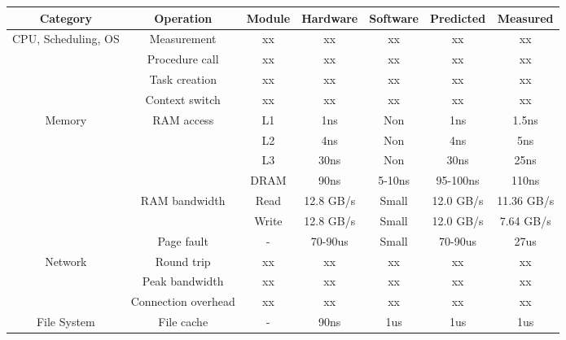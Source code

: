 
\begin{table*}[t]
	\centering
	\begin{tabular}{c|c|c|c|c|c|c}
		\hline
		\textbf{Category} & \textbf{Operation} & \textbf{Module} & \textbf{Hardware} & \textbf{Software}  & \textbf{Predicted} & \textbf{Measured} \\ \hline \hline

		\multirow{4}{*}{CPU, Scheduling, OS} & Measurement & xx & xx & xx & xx & xx \\ \cline{2-7}

          & Procedure call & xx & xx & xx & xx & xx \\ \cline{2-7}
          
          & Task creation & xx & xx & xx & xx & xx \\ \cline{2-7}
        
          & Context switch & xx & xx & xx & xx & xx \\ \hline

        \multirow{6}{*}{Memory} & \multirow{4}{*}{RAM access} & L1 & 1ns & Non & 1ns & 1.5ns \\ \cline{3-7}
                                &  & L2 & 4ns & Non & 4ns & 5ns \\ \cline{3-7}
                                &  & L3 & 30ns & Non & 30ns & 25ns \\ \cline{3-7}
                                &  & DRAM & 90ns & 5-10ns & 95-100ns & 110ns \\ \cline{2-7}

          & \multirow{2}{*}{RAM bandwidth} & Read & 12.8 GB/s & Small & 12.0 GB/s &  11.36 GB/s \\ \cline{3-7}

          & & Write & 12.8 GB/s & Small & 12.0 GB/s & 7.64 GB/s \\ \cline{2-7}

          & Page fault & - & 70-90us & Small & 70-90us & 27us \\ \hline

          \multirow{3}{*}{Network} & Round trip & xx & xx & xx & xx & xx \\ \cline{2-7}

         & Peak bandwidth & xx & xx & xx & xx & xx \\ \cline{2-7}

         & Connection overhead & xx & xx & xx & xx & xx \\ \hline

         \multirow{4}{*}{File System} & File cache & - & 90ns & 1us & 1us & 1us \\ \cline{2-7}
        

\end{tabular}
\end{table*}

